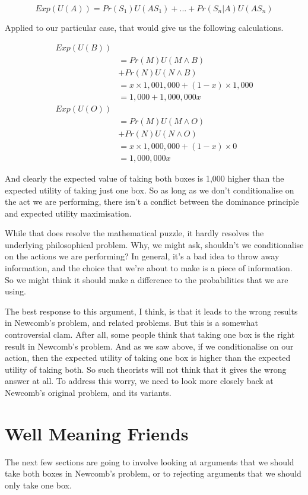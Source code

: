 \begin{equation*}
Exp(U(A)) = Pr(S_1)U(AS_1) + ... + Pr(S_n | A)U(AS_n)
\end{equation*}

Applied to our particular case, that would give us the following calculations.

\begin{align*}
Exp(U(B)) \\
&= Pr(M)U(M \wedge B)\\
&+ Pr(N)U(N \wedge B) \\
&= x \times 1,001,000 + (1-x) \times 1,000 \\
 &= 1,000 + 1,000,000x \\
Exp(U(O)) \\
&= Pr(M)U(M \wedge O)\\
&+ Pr(N)U(N \wedge O)\\
 &= x \times 1,000,000 + (1-x) \times 0 \\
 &= 1,000,000x
 \end{align*}
 
And clearly the expected value of taking both boxes is 1,000 higher than the expected utility of taking just one box. So as long as we don't conditionalise on the act we are performing, there isn't a conflict between the dominance principle and expected utility maximisation.

While that does resolve the mathematical puzzle, it hardly resolves the underlying philosophical problem. Why, we might ask, shouldn't we conditionalise on the actions we are performing? In general, it's a bad idea to throw away information, and the choice that we're about to make is a piece of information. So we might think it should make a difference to the probabilities that we are using.

The best response to this argument, I think, is that it leads to the wrong results in Newcomb's problem, and related problems. But this is a somewhat controversial clam. After all, some people think that taking one box is the right result in Newcomb's problem. And as we saw above, if we conditionalise on our action, then the expected utility of taking one box is higher than the expected utility of taking both. So such theorists will not think that it gives the wrong answer at all. To address this worry, we need to look more closely back at Newcomb's original problem, and its variants.

\section{Well Meaning Friends}
The next few sections are going to involve looking at arguments that we should take both boxes in Newcomb's problem, or to rejecting arguments that we should only take one box.

